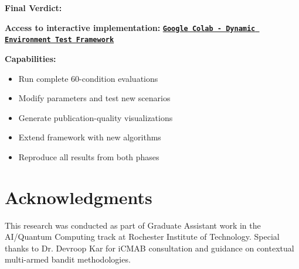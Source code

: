 \documentclass[11pt,a4paper]{article}
\newcommand{\colab}[1]{\textcolor{colabcolor}{\textbf{#1}}}
\begin{document}
\textbf{Final Verdict:}
\begin{center}
\end{center}


\begin{tcolorbox}[colback=colabcolor!20,colframe=colabcolor,title=\textbf{Interactive Framework Access}]
\begin{center}
    \textbf{Access to interactive implementation:}
    \vspace{0.3cm}
    \href{https://colab.research.google.com/drive/1JWB3CS-Q37I58EcQKUKe-k-q2PH8WM0U}{\colab{\texttt{Google Colab - Dynamic Environment Test Framework}}}

    \vspace{0.3cm}
    \textbf{Capabilities:}
    \begin{itemize}
        \item Run complete 60-condition evaluations
        \item Modify parameters and test new scenarios  
        \item Generate publication-quality visualizations
        \item Extend framework with new algorithms
        \item Reproduce all results from both phases
    \end{itemize}
\end{center}
\end{tcolorbox}

\section{Acknowledgments}

This research was conducted as part of Graduate Assistant work in the AI/Quantum Computing track at Rochester Institute of Technology. Special thanks to Dr. Devroop Kar for iCMAB consultation and guidance on contextual multi-armed bandit methodologies.
\end{document}
